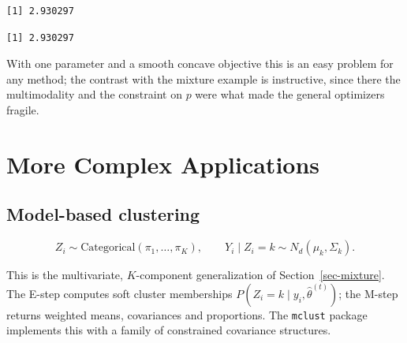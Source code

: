 \documentclass[
  letterpaper,
  DIV=11,
  numbers=noendperiod]{scrreprt}
\newenvironment{Shaded}{\begin{snugshade}}{\end{snugshade}}
\newcommand{\AttributeTok}[1]{\textcolor[rgb]{0.40,0.45,0.13}{#1}}
\newcommand{\DecValTok}[1]{\textcolor[rgb]{0.68,0.00,0.00}{#1}}
\newcommand{\FunctionTok}[1]{\textcolor[rgb]{0.28,0.35,0.67}{#1}}
\newcommand{\NormalTok}[1]{\textcolor[rgb]{0.00,0.23,0.31}{#1}}
\newcommand{\SpecialCharTok}[1]{\textcolor[rgb]{0.37,0.37,0.37}{#1}}
\newcommand{\StringTok}[1]{\textcolor[rgb]{0.13,0.47,0.30}{#1}}
\begin{document}
\begin{Shaded}
\end{Shaded}

\begin{verbatim}
[1] 2.930297
\end{verbatim}

\begin{Shaded}
\end{Shaded}

\begin{verbatim}
[1] 2.930297
\end{verbatim}

With one parameter and a smooth concave objective this is an easy
problem for any method; the contrast with the mixture example is
instructive, since there the multimodality and the constraint on \(p\)
were what made the general optimizers fragile.

\section{More Complex Applications}\label{more-complex-applications}

\subsection{Model-based clustering}\label{model-based-clustering}

\[
Z_i \sim \text{Categorical}(\pi_1, \ldots, \pi_K),
\qquad Y_i \mid Z_i = k \sim N_d(\mu_k, \Sigma_k) .
\]

This is the multivariate, \(K\)-component generalization of
Section~\ref{sec-mixture}. The E-step computes soft cluster memberships
\(P(Z_i = k \mid y_i, \hat\theta^{(t)})\); the M-step returns weighted
means, covariances and proportions. The \texttt{mclust} package
implements this with a family of constrained covariance structures.
\end{document}

